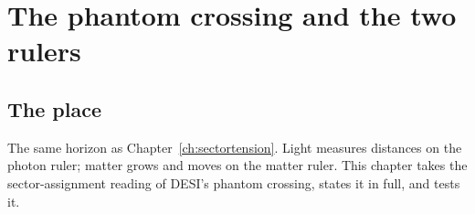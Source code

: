 \chapter{The phantom crossing and the two rulers}\label{ch:phantom}

\section*{The place}
The same horizon as Chapter~\ref{ch:sectortension}. Light measures distances on the photon ruler; matter grows and moves on the matter ruler. This
chapter takes the sector-assignment reading of DESI's phantom crossing, states it in full, and tests it.

